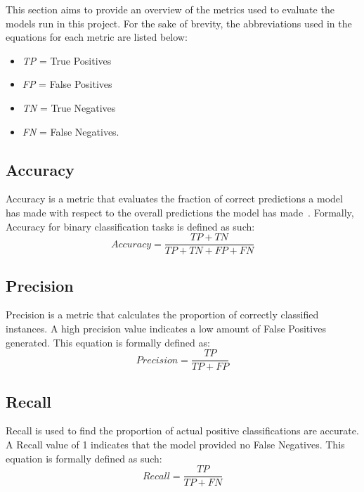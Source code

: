 \documentclass[11pt, a4paper]{article}
\begin{document}
This section aims to provide an overview of the metrics used to evaluate the models run in this project. For the sake of brevity, the abbreviations used in the equations for each metric are listed below:
\begin{itemize}
\item \emph{TP} = True Positives 
\item \emph{FP} = False Positives 
\item \emph{TN} = True Negatives 
\item \emph{FN} = False Negatives.
\end{itemize}

\subsection{Accuracy}

Accuracy is a metric that evaluates the fraction of correct predictions a model has made with respect to the overall predictions the model has made~\cite{accuracy}. Formally, Accuracy for binary classification tasks is defined as such:\\
\begin{equation}
Accuracy = \frac{TP + TN}{TP + TN + FP + FN}
\end{equation}

\subsection{Precision}

Precision is a metric that calculates the proportion of correctly classified instances. A high precision value indicates a low amount of False Positives generated. This equation is formally defined as:\\
\begin{equation}
Precision = \frac{TP}{TP + FP}
\end{equation}

\subsection{Recall}

Recall is used to find the proportion of actual positive classifications are accurate. A Recall value of 1 indicates that the model provided no False Negatives.  This equation is formally defined as such:\\
\begin{equation}
Recall = \frac{TP}{TP + FN}
\end{equation}
\end{document}
